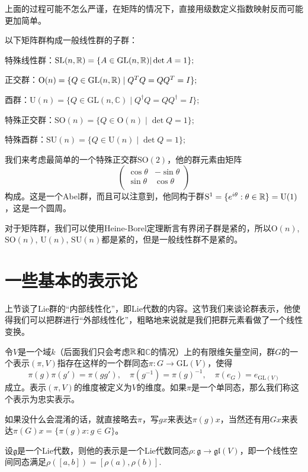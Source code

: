 \documentclass[9pt]{extarticle}
\newcommand{\cc}{\mathbb{C}}
\newcommand{\lag}{{\mathfrak{g}}}
\begin{document}
上面的过程可能不怎么严谨，在矩阵的情况下，直接用级数定义指数映射反而可能更加简单。

\para 以下矩阵群构成一般线性群的子群：

 特殊线性群：$\mathrm{SL}(n,\mathbb{R})=\{A\in \mathrm{GL}(n,\mathbb{R})|\det A=1\};$

 正交群：$\mathrm{O}(n) = \{ Q \in \mathrm{GL}(n,\mathbb{R}) \mid Q^T Q = Q Q^T = I \};$

 酉群：$\mathrm{U}(n) = \{ Q \in \mathrm{GL}(n,\cc) \mid Q^\dag Q = Q Q^\dag = I \};$

 特殊正交群：$\mathrm{SO}(n) =\{ Q \in \mathrm{O}(n) \mid \det Q=1 \};$

 特殊酉群：$\mathrm{SU}(n) =\{ Q \in \mathrm{U}(n) \mid \det Q=1 \};$

我们来考虑最简单的一个特殊正交群$\mathrm{SO}(2)$，他的群元素由矩阵
\[
	\begin{pmatrix}
	\cos \theta&-\sin \theta\\
	\sin \theta&\cos \theta\\
	\end{pmatrix}
\]
构成。这是一个Abel群，而且可以注意到，他同构于群$\mathrm{S}^1=\{e^{i\theta}:\theta\in\mathbb{R}\}=\mathrm{U}(1)$，这是一个圆周。

\para 对于矩阵群，我们可以使用Heine-Borel定理断言有界闭子群是紧的，所以$\mathrm{O}(n)$, $\mathrm{SO}(n)$, $\mathrm{U}(n)$, $\mathrm{SU}(n)$都是紧的，但是一般线性群不是紧的。

\section{一些基本的表示论}

上节谈了Lie群的“内部线性化”，即Lie代数的内容。这节我们来谈论群表示，他使得我们可以把群进行“外部线性化”，粗略地来说就是我们把群元素看做了一个线性变换。

\para 令$V$是一个域$k$（后面我们只会考虑$\mathbb{R}$和$\cc$的情况）上的有限维矢量空间，群$G$的一个表示$(\pi, V)$指存在这样的一个群同态$\pi:G\rightarrow \mathrm{GL}(V)$，使得
\[
	\pi(g)\pi(g')=\pi(gg'),\quad \pi(g^{-1})=\pi(g)^{-1},\quad \pi(e_G)=e_{\mathrm{GL}(V)}
\]
成立。表示$(\pi, V)$的维度被定义为$V$的维度。如果$\pi$是一个单同态，那么我们称这个表示为忠实表示。

如果没什么会混淆的话，就直接略去$\pi$，写$gx$来表达$\pi(g)x$，当然还有用$Gx$来表达$\pi(G)x=\{\pi(g)x:g\in G\}$。

设$\lag$是一个Lie代数，则他的表示是一个Lie代数同态$\rho:\lag \to \mathfrak{gl}(V)$，即一个线性空间同态满足$\rho([a,b])=[\rho(a),\rho(b)]$.
\end{document}

